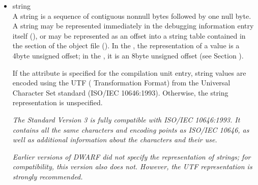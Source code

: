 \begin{itemize}
The third type of reference can identify any debugging
information type entry that has been placed in its own
. This type of 
reference () is the
64\dash bit type signature 
(see Section ) 
that was computed
for the type.

\textit{The use of compilation unit relative references will reduce the
number of link\dash time relocations and so speed up linking. The
use of the second and third type of reference allows for the
sharing of information, such as types, across compilation
units.}

\textit{A reference to any kind of compilation unit identifies the
debugging information entry for that unit, not the preceding
header.}

\item string \\
A string is a sequence of contiguous non\dash null bytes followed by
one null byte. 
A string may be represented immediately in the
debugging information entry itself 
(), or may
be represented as an 
offset into a string table contained in
the \dotdebugstr{} section of the object file 
(). In
the \thirtytwobitdwarfformat, the representation of a 
value is a 4\dash byte unsigned offset; in the \sixtyfourbitdwarfformat,
it is an 8\dash byte unsigned offset 
(see Section ).

If the 
 attribute is specified for the
compilation unit entry, string values are encoded using the
UTF ( Transformation Format) from the Universal
Character Set standard (ISO/IEC 10646:1993). Otherwise,
the string representation is unspecified.

\textit{The  Standard Version 3 is fully compatible with
ISO/IEC 10646:1993. It contains all the same characters
and encoding points as ISO/IEC 10646, as well as additional
information about the characters and their use.}

\textit{Earlier versions of DWARF did not specify the representation
of strings; for compatibility, this version also does
not. However, the UTF representation is strongly recommended.}

\end{itemize}

